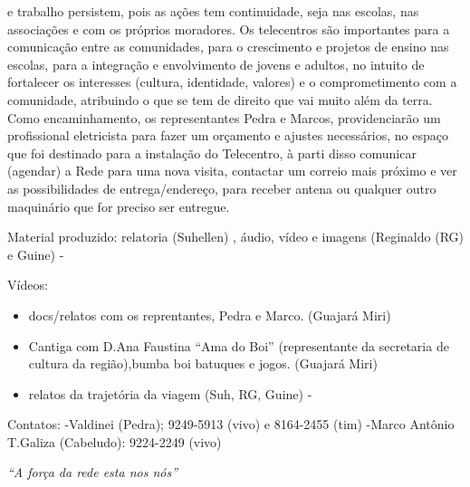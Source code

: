 \documentclass[a4paper, 11pt, oneside]{Relatorio_sem}  %
\begin{document}
\begin{description}
    e trabalho persistem, pois as ações tem continuidade, seja nas
    escolas, nas associações e com os próprios moradores. Os
    telecentros são importantes para a comunicação entre as
    comunidades, para o crescimento e projetos de ensino nas escolas,
    para a integração e envolvimento de jovens e adultos, no intuito
    de fortalecer os interesses (cultura, identidade, valores) e o
    comprometimento com a comunidade, atribuindo o que se tem de
    direito que vai muito além da terra.  Como encaminhamento, os
    representantes Pedra e Marcos, providenciarão um profissional
    eletricista para fazer um orçamento e ajustes necessários, no
    espaço que foi destinado para a instalação do Telecentro, à parti
    disso comunicar (agendar) a Rede para uma nova visita, contactar
    um correio mais próximo e ver as possibilidades de
    entrega/endereço, para receber antena ou qualquer outro maquinário
    que for preciso ser
    entregue.
\end{description}

Material produzido: 
relatoria (Suhellen) ,
áudio, vídeo e imagens (Reginaldo (RG) e Guine) - 

Vídeos: 
\begin{itemize}
 \item docs/relatos com os reprentantes, Pedra e Marco. (Guajará Miri)
 \item Cantiga com D.Ana Faustina ``Ama do Boi'' (representante da
   secretaria de cultura da região),bumba boi batuques e
   jogos. (Guajará Miri)
 \item relatos da trajetória da viagem (Suh, RG, Guine) -
\end{itemize}


Contatos: -Valdinei (Pedra); 9249-5913 (vivo) e 8164-2455 (tim) -Marco
Antônio T.Galiza (Cabeludo): 9224-2249 (vivo)




\clearpage  %

\pagestyle{empty}  %

\null\vfill
\textit{``A força da rede esta nos nós''}
\end{document}

